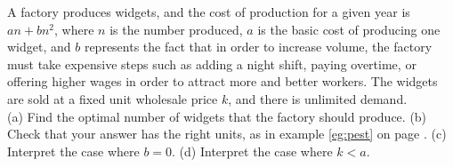 A factory produces widgets, and the cost of production for
a given year is $an+bn^2$, where $n$ is the number produced,
$a$ is the basic cost of producing one widget, and $b$
represents the fact that in order to increase volume, the
factory must take expensive steps such as adding a night
shift, paying overtime, or offering higher wages in order
to attract more and better workers. The widgets are sold
at a fixed unit wholesale price $k$, and there is unlimited demand.\\
(a) Find the optimal number of widgets that the factory
should produce. \answercheck\hwendpart
(b)  Check that your answer has the right units, as in example 
\ref{eg:pest} on page \pageref{eg:pest}.\hwendpart
(c) Interpret the case where $b=0$.\hwendpart
(d) Interpret the case where $k<a$.\hwendpart

